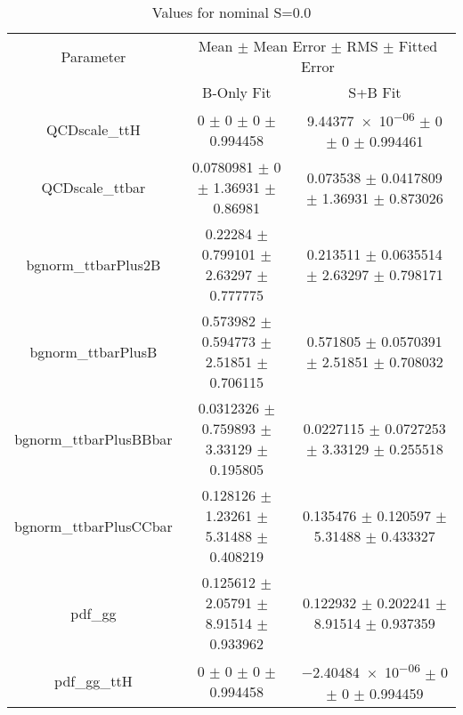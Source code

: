 \begin{table}
\centering
\caption{Values for nominal S=0.0}
\begin{tabular}{ccc}
\toprule
Parameter & \multicolumn{2}{c}{Mean $\pm$ Mean Error $\pm$ RMS $\pm$ Fitted Error}\\
 & B-Only Fit & S+B Fit\\
\midrule
QCDscale\_ttH & \num{0} $\pm$ \num{0} $\pm$ \num{0} $\pm$ \num{0.994458} & \num{9.44377e-06} $\pm$ \num{0} $\pm$ \num{0} $\pm$ \num{0.994461}\\
QCDscale\_ttbar & \num{0.0780981} $\pm$ \num{0} $\pm$ \num{1.36931} $\pm$ \num{0.86981} & \num{0.073538} $\pm$ \num{0.0417809} $\pm$ \num{1.36931} $\pm$ \num{0.873026}\\
bgnorm\_ttbarPlus2B & \num{0.22284} $\pm$ \num{0.799101} $\pm$ \num{2.63297} $\pm$ \num{0.777775} & \num{0.213511} $\pm$ \num{0.0635514} $\pm$ \num{2.63297} $\pm$ \num{0.798171}\\
bgnorm\_ttbarPlusB & \num{0.573982} $\pm$ \num{0.594773} $\pm$ \num{2.51851} $\pm$ \num{0.706115} & \num{0.571805} $\pm$ \num{0.0570391} $\pm$ \num{2.51851} $\pm$ \num{0.708032}\\
bgnorm\_ttbarPlusBBbar & \num{0.0312326} $\pm$ \num{0.759893} $\pm$ \num{3.33129} $\pm$ \num{0.195805} & \num{0.0227115} $\pm$ \num{0.0727253} $\pm$ \num{3.33129} $\pm$ \num{0.255518}\\
bgnorm\_ttbarPlusCCbar & \num{0.128126} $\pm$ \num{1.23261} $\pm$ \num{5.31488} $\pm$ \num{0.408219} & \num{0.135476} $\pm$ \num{0.120597} $\pm$ \num{5.31488} $\pm$ \num{0.433327}\\
pdf\_gg & \num{0.125612} $\pm$ \num{2.05791} $\pm$ \num{8.91514} $\pm$ \num{0.933962} & \num{0.122932} $\pm$ \num{0.202241} $\pm$ \num{8.91514} $\pm$ \num{0.937359}\\
pdf\_gg\_ttH & \num{0} $\pm$ \num{0} $\pm$ \num{0} $\pm$ \num{0.994458} & \num{-2.40484e-06} $\pm$ \num{0} $\pm$ \num{0} $\pm$ \num{0.994459}\\
\bottomrule
\end{tabular}
\end{table}